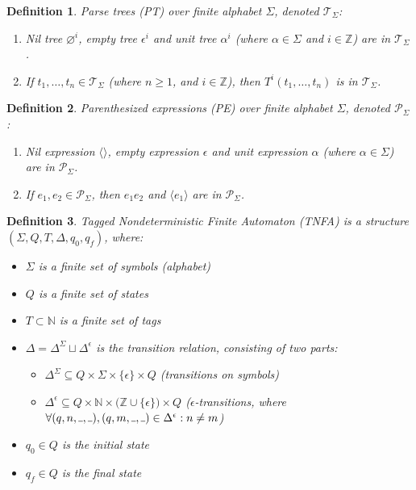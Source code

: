 \documentclass[AMA,STIX1COL]{WileyNJD-v2}
\newcommand{\Xl}{\langle}
\newcommand{\Xr}{\rangle}
\newcommand{\Xm}{\langle\!\rangle}
\newcommand{\Xund}{\rule{.4em}{.4pt}}
\newcommand{\XP}{\mathcal{P}}
\newcommand{\XT}{\mathcal{T}}
\newcommand{\YN}{\mathbb{N}}
\newcommand{\YZ}{\mathbb{Z}}
\newtheorem{Xdef}{Definition}
\begin{document}
    \begin{Xdef}
    \emph{Parse trees (PT)} over finite alphabet $\Sigma$, denoted $\XT_\Sigma$:
    \begin{enumerate}
        \item
          Nil tree ${\varnothing}^i$,
          empty tree ${\epsilon}^i$ and
          unit tree ${\alpha}^i$ (where $\alpha \in \Sigma$ and $i \in \YZ$)
          are in $\XT_\Sigma$.
        \item If $t_1, \dots, t_n \in \XT_\Sigma$ (where $n \geq 1$, and $i \in \YZ$), then
          ${T}^i(t_1, \dots, t_n)$
          is in $\XT_\Sigma$.
    \end{enumerate}
    \end{Xdef}


    \begin{Xdef}
    \emph{Parenthesized expressions (PE)} over finite alphabet $\Sigma$, denoted $\XP_\Sigma$:
    \begin{enumerate}
        \item
            Nil expression $\Xm$,
            empty expression $\epsilon$ and
            unit expression $\alpha$ (where $\alpha \in \Sigma$)
            are in $\XP_\Sigma$.
        \item If $e_1, e_2 \in \XP_\Sigma$, then
            $e_1 e_2$ and
            $\Xl e_1 \Xr$
            are in $\XP_\Sigma$.
    \end{enumerate}
    \end{Xdef}


    \begin{Xdef}
    \emph{Tagged Nondeterministic Finite Automaton (TNFA)}
    is a structure $(\Sigma, Q, T, \Delta, q_0, q_f)$, where:
    \begin{itemize}
        \item[] $\Sigma$ is a finite set of symbols (\emph{alphabet})
        \item[] $Q$ is a finite set of \emph{states}
        \item[] $T\subset\YN$ is a finite set of \emph{tags}
        \item[] $\Delta = \Delta^\Sigma \sqcup \Delta^\epsilon$ is the \emph{transition} relation,
            consisting of two parts:
        \begin{itemize}
            \item[] $\Delta^\Sigma \subseteq Q \times \Sigma \times \{\epsilon\} \times Q$ (transitions on symbols)
            \item[] $\Delta^\epsilon \subseteq Q \times \YN \times \big( \YZ \cup \{\epsilon\} \big) \times Q$
                ($\epsilon$-transitions, where $\forall (q, n, \Xund, \Xund), (q, m, \Xund, \Xund) \in \Delta^\epsilon: n \neq m$)
        \end{itemize}
        \item[] $q_0 \in Q$ is the \emph{initial} state
        \item[] $q_f \in Q$ is the \emph{final} state
    \end{itemize}
    \end{Xdef}
\end{document}
